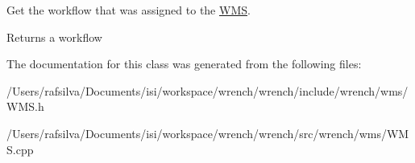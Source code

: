 Get the workflow that was assigned to the \hyperlink{classwrench_1_1_w_m_s}{W\+MS}. 

\begin{DoxyReturn}{Returns}
a workflow 
\end{DoxyReturn}


The documentation for this class was generated from the following files\+:\begin{DoxyCompactItemize}
\item 
/\+Users/rafsilva/\+Documents/isi/workspace/wrench/wrench/include/wrench/wms/W\+M\+S.\+h\item 
/\+Users/rafsilva/\+Documents/isi/workspace/wrench/wrench/src/wrench/wms/W\+M\+S.\+cpp\end{DoxyCompactItemize}
